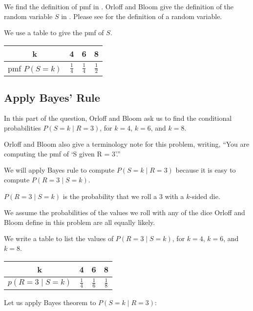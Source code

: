 \documentclass[a4paper,11pt]{article}
\begin{document}
We find the definition of pmf in \cite{reading4b}.  Orloff and Bloom
give the definition of the random variable $S$ in \cite{probSet2}.
Please see \cite{reading4} for the definition of a random variable.

We use a table to give the pmf of $S$.

\begin{center}
  \begin{tabular}{ | c | c | c | c| }
    \hline
    k & 4 & 6 & 8    \\ \hline
    pmf $P\left( S=k \right)$ & $\frac{1}{4}$ & $\frac{1}{4}$ 
      & $\frac{1}{2}$ \\ \hline
  \end{tabular}
\end{center}

\subsection{Apply Bayes' Rule}
In this part of the question, Orloff and Bloom ask us to find the
conditional probabilities $P \left( S = k \mid R = 3\right)$, for
$k=4$, $k=6$, and $k=8$.

Orloff and Bloom also give a terminology note for this problem, 
writing, ``You are computing the pmf of ‘S given R = 3’.''
\cite{probSet2}

We will apply Bayes rule to compute $P \left( S = k \mid R = 3\right)$ 
because it is easy to compute $P \left( R=3 \mid S=k \right)$.

$P \left( R=3 \mid S=k \right)$ is the probability that we roll a $3$ 
with a $k$-sided die.

We assume the probabilities of the values we roll with any of the dice
Orloff and Bloom define in this problem are all equally likely.

We write a table to list the values of $P \left( R=3 \mid S=k \right)$,
for $k=4$, $k=6$, and $k=8$.

\begin{center}
  \begin{tabular}{ | c | c | c | c| }
    \hline
    k & 4 & 6 & 8    \\ \hline
    $p\left( R=3 \mid S=k \right)$ & $\frac{1}{4}$ & $\frac{1}{6}$ 
      & $\frac{1}{8}$ \\ \hline
  \end{tabular}
\end{center}

Let us apply Bayes theorem \cite{reading3} to 
$P \left( S=k \mid R=3 \right)$:
\end{document}
